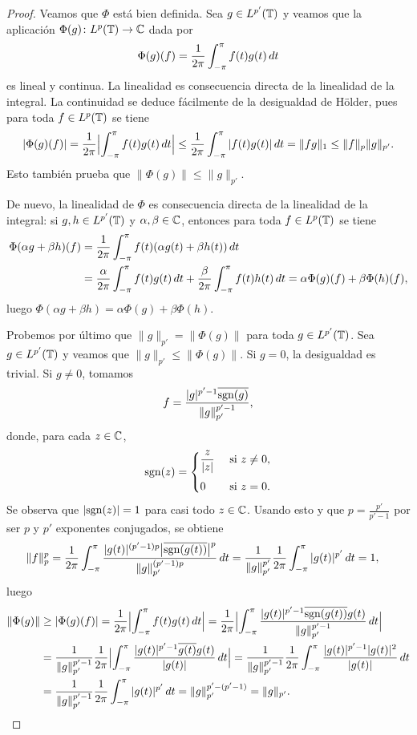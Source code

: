 \documentclass[a4paper, 12pt, oneside]{book}
\begin{document}
\begin{proof}
    Veamos que $\Phi$ está bien definida. Sea $g \in L^{p'}(\mathbb T)$ y veamos que la aplicación $\Phi(g)\colon L^p(\mathbb T)\to \mathbb C$ dada por
    \[\Phi(g)(f) = \frac{1}{2\pi}\int_{-\pi}^{\pi} f(t)g(t) \, dt\]
    es lineal y continua. La linealidad es consecuencia directa de la linealidad de la integral. La continuidad se deduce fácilmente de la desigualdad de Hölder, pues para toda $f \in L^p(\mathbb T)$ se tiene
    \[|\Phi(g)(f)| = \frac{1}{2\pi}\Bigl|\int_{-\pi}^{\pi} f(t)g(t) \, dt\Bigr| \leq \frac{1}{2\pi}\int_{-\pi}^{\pi} |f(t){g(t)}| \, dt = \|fg\|_1 \leq \|f\|_p\|g\|_{p'}.\]
    Esto también prueba que $\|\Phi(g)\| \leq \|g\|_{p'}$.
    
    De nuevo, la linealidad de $\Phi$ es consecuencia directa de la linealidad de la integral: si $g,h \in L^{p'}(\mathbb T)$ y $\alpha,\beta \in \mathbb C$, entonces para toda $f \in L^p(\mathbb T)$ se tiene
    \begin{align*}
        \Phi(\alpha g + \beta h)(f) &= \frac{1}{2\pi}\int_{-\pi}^{\pi} f(t)(\alpha g(t)+\beta h(t)) \, dt \\ &= \frac{\alpha}{2\pi}\int_{-\pi}^{\pi} f(t)g(t) \, dt+\frac{\beta}{2\pi}\int_{-\pi}^{\pi} f(t)h(t) \, dt = \alpha \Phi(g)(f)+\beta \Phi(h)(f),
    \end{align*}
    luego $\Phi(\alpha g + \beta h) = \alpha \Phi(g) + \beta \Phi(h)$.

    Probemos por último que $\|g\|_{p'} = \|\Phi(g)\|$ para toda $g \in L^{p'}(\mathbb T)$. Sea $g \in L^{p'}(\mathbb T)$ y veamos que $\|g\|_{p'} \leq \|\Phi(g)\|$. Si $g = 0$, la desigualdad es trivial. Si $g \neq 0$, tomamos
    \[f = \frac{|g|^{p'-1}\overline{\textup{sgn}(g)}}{\|g\|^{p'-1}_{p'}},\]
    donde, para cada $z \in \mathbb C$,
    \[\sgn(z) = \begin{cases}
        \displaystyle \frac{z}{|z|} & $ si $ z \neq 0, \\[10pt]
        0 & $ si $ z = 0.
    \end{cases}\]
    Se observa que $|\textup{sgn}(z)| = 1$ para casi todo $z\in\mathbb C$. Usando esto y que $p = \frac{p'}{p'-1}$ por ser $p$ y $p'$ exponentes conjugados, se obtiene
    \[\begin{aligned}[t]
        \|f\|_p^p &= \frac{1}{2\pi}\int_{-\pi}^{\pi} \frac{|g(t)|^{(p'-1)p}\bigl|\overline{\textup{sgn} (g(t))}\bigr|^p}{\|g\|_{p'}^{(p'-1)p}} \, dt = \frac{1}{\|g\|_{p'}^{p'}}\frac{1}{2\pi}\int_{-\pi}^{\pi} |g(t)|^{p'} \, dt = 1,
    \end{aligned}\]
    luego
    \[\begin{aligned}[t]
        \|\Phi(g)\| &\geq |\Phi(g)(f)| = \frac{1}{2\pi}\Bigl|\int_{-\pi}^{\pi} f(t)g(t) \, dt\Bigr| = \frac{1}{2\pi}\Bigl|\int_{-\pi}^{\pi} \frac{|g(t)|^{p'-1}\overline{\textup{sgn}(g(t))}g(t)}{\|g\|_{p'}^{p'-1}} \, dt\Bigr| \\
        &= \frac{1}{\|g\|_{p'}^{p'-1}} \frac{1}{2\pi}\Bigl|\int_{-\pi}^{\pi} \frac{|g(t)|^{p'-1}\overline{g(t)}g(t)}{|g(t)|} \, dt\Bigr| = \frac{1}{\|g\|_{p'}^{p'-1}} \frac{1}{2\pi}\int_{-\pi}^{\pi} \frac{|g(t)|^{p'-1}|g(t)|^2}{|g(t)|} \, dt
        \\ &= \frac{1}{\|g\|_{p'}^{p'-1}} \frac{1}{2\pi}\int_{-\pi}^{\pi} |g(t)|^{p'} \, dt = \|g\|_{p'}^{p'-(p'-1)} = \|g\|_{p'}.
    \end{aligned}\]


\end{proof}
\end{document}
